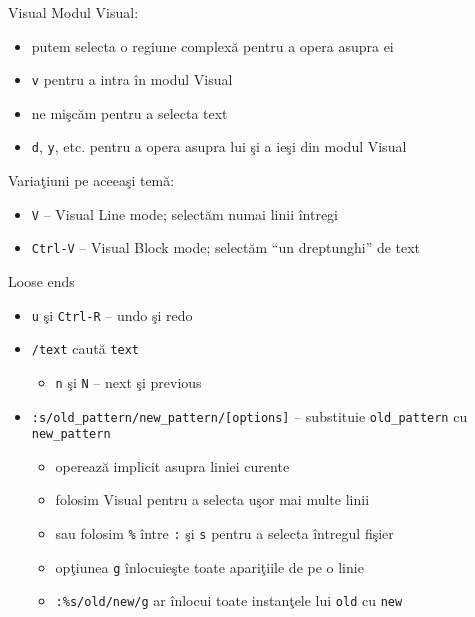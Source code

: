 \documentclass{beamer}
\begin{document}
\begin{frame}{Visual}
Modul Visual:
\begin{itemize}
  \item<1-> putem selecta o regiune complexă pentru a opera asupra ei
  \item<2-> \texttt{v} pentru a intra în modul Visual
  \item<3-> ne mişcăm pentru a selecta text
  \item<4-> \texttt{d}, \texttt{y}, etc. pentru a opera asupra lui şi a ieşi
  din modul Visual
\end{itemize}

 Variaţiuni pe aceeaşi temă:
\begin{itemize}
  \item<6-> \texttt{V} -- Visual Line mode; selectăm numai linii întregi
  \item<7-> \texttt{Ctrl-V} -- Visual Block mode; selectăm ``un dreptunghi''
  de text
\end{itemize}
\end{frame}

\begin{frame}{Loose ends}
\begin{itemize}
  \item<1-> \texttt{u} şi \texttt{Ctrl-R} -- undo şi redo
  \item<2-> \texttt{/text} caută \texttt{text}
    \begin{itemize}
    \item<2-> \texttt{n} şi \texttt{N} -- next şi previous
    \end{itemize}
  \item<3-> \texttt{:s/old\_pattern/new\_pattern/[options]} -- substituie
  \texttt{old\_pattern} cu \texttt{new\_pattern}
    \begin{itemize}
    \item<4-> operează implicit asupra liniei curente
    \item<5-> folosim Visual pentru a selecta uşor mai multe linii
    \item<6-> sau folosim \texttt{\%} între \texttt{:} şi \texttt{s} pentru a
    selecta întregul fişier
    \item<7-> opţiunea \texttt{g} înlocuieşte toate apariţiile de pe o linie
    \item<8-> \texttt{:\%s/old/new/g} ar înlocui toate instanţele lui
    \texttt{old} cu \texttt{new}
    \end{itemize}
\end{itemize}
\end{frame}
\end{document}
